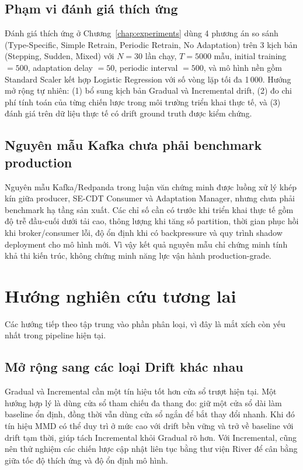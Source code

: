 \subsection{Phạm vi đánh giá thích ứng}
Đánh giá thích ứng ở Chương~\ref{chap:experiments} dùng 4 phương án so sánh (Type-Specific, Simple Retrain, Periodic Retrain, No Adaptation) trên 3 kịch bản (Stepping, Sudden, Mixed) với $N = 30$ lần chạy, $T = 5000$ mẫu, initial training $=500$, adaptation delay $=50$, periodic interval $=500$, và mô hình nền gồm Standard Scaler kết hợp Logistic Regression với số vòng lặp tối đa 1\,000. Hướng mở rộng tự nhiên: (1) bổ sung kịch bản Gradual và Incremental drift, (2) đo chi phí tính toán của từng chiến lược trong môi trường triển khai thực tế, và (3) đánh giá trên dữ liệu thực tế có drift ground truth được kiểm chứng.

\subsection{Nguyên mẫu Kafka chưa phải benchmark production}
Nguyên mẫu Kafka/Redpanda trong luận văn chứng minh được luồng xử lý khép kín giữa producer, SE-CDT Consumer và Adaptation Manager, nhưng chưa phải benchmark hạ tầng sản xuất. Các chỉ số cần có trước khi triển khai thực tế gồm độ trễ đầu-cuối dưới tải cao, thông lượng khi tăng số partition, thời gian phục hồi khi broker/consumer lỗi, độ ổn định khi có backpressure và quy trình shadow deployment cho mô hình mới. Vì vậy kết quả nguyên mẫu chỉ chứng minh tính khả thi kiến trúc, không chứng minh năng lực vận hành production-grade.

\section{Hướng nghiên cứu tương lai}

Các hướng tiếp theo tập trung vào phần phân loại, vì đây là mắt xích còn yếu nhất trong pipeline hiện tại.

\subsection{Mở rộng sang các loại Drift khác nhau}
Gradual và Incremental cần một tín hiệu tốt hơn cửa sổ trượt hiện tại. Một hướng hợp lý là dùng cửa sổ tham chiếu đa thang đo: giữ một cửa sổ dài làm baseline ổn định, đồng thời vẫn dùng cửa sổ ngắn để bắt thay đổi nhanh. Khi đó tín hiệu MMD có thể duy trì ở mức cao với drift bền vững và trở về baseline với drift tạm thời, giúp tách Incremental khỏi Gradual rõ hơn. Với Incremental, cũng nên thử nghiệm các chiến lược cập nhật liên tục bằng thư viện River để cân bằng giữa tốc độ thích ứng và độ ổn định mô hình.


